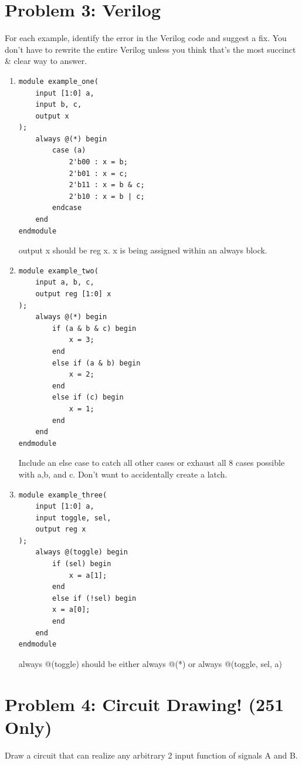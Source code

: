 \section*{Problem 3: Verilog}
For each example, identify the error in the Verilog code and suggest a fix. You don't have to rewrite the entire Verilog unless you think that's the most succinct \& clear way to answer.
\begin{enumerate}[label=(\alph*)]

\item \begin{verbatim}
module example_one(
	input [1:0] a,
	input b, c,
	output x
);
	always @(*) begin
	    case (a)
	        2'b00 : x = b;
	        2'b01 : x = c;
	        2'b11 : x = b & c;
	        2'b10 : x = b | c;
	    endcase
	end
endmodule
\end{verbatim}

\begin{solution}
output x should be reg x. x is being assigned within an always block. 
\end{solution}

\item \begin{verbatim}
module example_two(
	input a, b, c,
	output reg [1:0] x
);
    always @(*) begin
    	if (a & b & c) begin
    		x = 3;
    	end
    	else if (a & b) begin
    		x = 2;
    	end
    	else if (c) begin
    		x = 1;
    	end
    end
endmodule
\end{verbatim}

\begin{solution}
Include an else case to catch all other cases or exhaust all 8 cases possible with a,b, and c. Don't want to accidentally create a latch.
\end{solution}

\item \begin{verbatim}
module example_three(
	input [1:0] a,
	input toggle, sel, 
	output reg x
);
    always @(toggle) begin
        if (sel) begin
            x = a[1];
        end
        else if (!sel) begin
    	x = a[0];
        end
    end
endmodule
\end{verbatim}

\begin{solution}
always @(toggle) should be either always @(*) or always @(toggle, sel, a)
\end{solution}

\end{enumerate}
\section*{Problem 4: Circuit Drawing! (251 Only)}
Draw a circuit that can realize any arbitrary 2 input function of signals A and B. 

